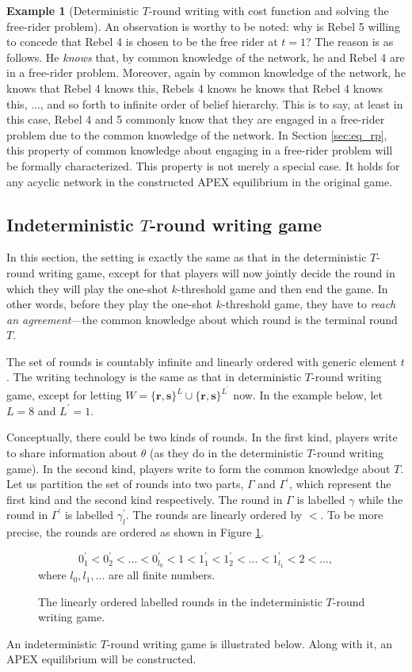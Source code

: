 \documentclass[12pt,letter]{article}
\theoremstyle{definition}
\newtheorem{example}{Example}
\theoremstyle{remark}
\theoremstyle{claim}
\begin{document}
\begin{example}[Deterministic $T$-round writing with cost function and solving the free-rider problem]
An observation is worthy to be noted: why is Rebel 5 willing to concede that Rebel 4 is chosen to be the free rider at $t=1$? The reason is as follows. He \textit{knows} that, by common knowledge of the network, he and Rebel 4 are in a free-rider problem. Moreover, again by common knowledge of the network, he knows that Rebel 4 knows this, Rebels 4 knows he knows that Rebel 4 knows this, ..., and so forth to infinite order of belief hierarchy. This is to say, at least in this case, Rebel 4 and 5 commonly know that they are engaged in a free-rider problem due to the common knowledge of the network. In Section \ref{sec:eq_rp}, this property of common knowledge about engaging in a free-rider problem will be formally characterized. This property is not merely a special case. It holds for any acyclic network in the constructed APEX equilibrium in the original game.  

\end{example}


\subsection{Indeterministic $T$-round writing game}
\label{sec:indem_writing}
In this section, the setting is exactly the same as that in the deterministic $T$-round writing game, except for that players will now jointly decide the round in which they will play the one-shot $k$-threshold game and then end the game. In other words, before they play the one-shot $k$-threshold game, they have to \textit{reach an agreement}---the common knowledge about which round is the terminal round ${T}$. 

The set of rounds is countably infinite and linearly ordered with generic element $t$. The writing technology is the same as that in deterministic $T$-round writing game, except for letting $W=\{\textbf{r},\textbf{s}\}^L\cup \{\textbf{r},\textbf{s}\}^{L^{'}}$ now. In the example below, let $L=8$ and $L^{'}=1$. 

Conceptually, there could be two kinds of rounds. In the first kind, players write to share information about $\theta$ (as they do in the deterministic $T$-round writing game). In the second kind, players write to form the common knowledge about ${T}$. Let us partition the set of rounds into two parts, $\Gamma$ and $\Gamma^{'}$, which represent the first kind and the second kind respectively. The round in $\Gamma$ is labelled $\gamma$ while the round in $\Gamma^{'}$ is labelled $\gamma^{'}_l$. The rounds are linearly ordered by $<$. To be more precise, the rounds are ordered as shown in Figure \ref{fig:ordered_writing}.
\begin{figure}

\label{fig:ordered_writing}
\[0^{'}_1<0^{'}_2<...<0^{'}_{l_0}<1<1^{'}_{1}<1^{'}_{2}<...<1^{'}_{l_1}<2<...,\]
where $l_0,l_1,...$ are all finite numbers.
\caption{The linearly ordered labelled rounds in the indeterministic $T$-round writing game.}
\end{figure}
An indeterministic $T$-round writing game is illustrated below. Along with it, an APEX equilibrium will be constructed. 
\end{document}
